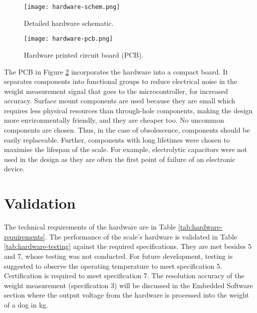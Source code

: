\begin{figure}[!ht]
	\centering
	\texttt{[image: hardware-schem.png]}
	\caption{Detailed hardware schematic.}
	\label{fig:schematic}
\end{figure}

\begin{figure}[!ht]
	\centering
	\texttt{[image: hardware-pcb.png]}
	\caption{Hardware printed circuit board (PCB).}
	\label{fig:hardware-pcb}
\end{figure}

The PCB in Figure \ref{fig:hardware-pcb} incorporates the hardware into a compact board. It separates components into functional groups to reduce electrical noise in the weight measurement signal that goes to the microcontroller, for increased accuracy. Surface mount components are used because they are small which requires less physical resources than through-hole components, making the design more environmentally friendly, and they are cheaper too. No uncommon components are chosen. Thus, in the case of obsolescence, components should be easily replaceable. Further, components with long lifetimes were chosen to maximise the lifespan of the scale. For example, electrolytic capacitors were not used in the design as they are often the first point of failure of an electronic device.

\section{Validation}

The technical requirements of the hardware are in Table \ref{tab:hardware-requirements}. The performance of the scale’s hardware is validated in Table \ref{tab:hardware-testing} against the required specifications. They are met besides 5 and 7, whose testing was not conducted. For future development, testing is suggested to observe the operating temperature to meet specification 5. Certification is required to meet specification 7. The resolution accuracy of the weight measurement (specification 3) will be discussed in the Embedded Software section where the output voltage from the hardware is processed into the weight of a dog in kg.

